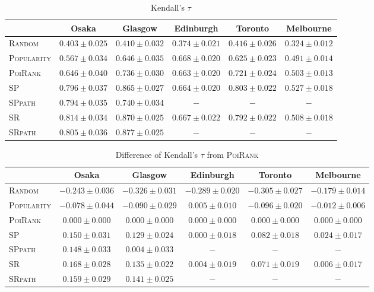 \begin{table*}[t]
\caption{Kendall's $\tau$}
\label{tab:tau}
\centering
\begin{tabular}{l|ccccc} \hline
 & Osaka & Glasgow & Edinburgh & Toronto & Melbourne \\ \hline
\textsc{Random} & $0.403\pm0.025$ & $0.410\pm0.032$ & $0.374\pm0.021$ & $0.416\pm0.026$ & $0.324\pm0.012$ \\
\textsc{Popularity} & $0.567\pm0.034$ & $0.646\pm0.035$ & $\mathbf{0.668\pm0.020}$ & $0.625\pm0.023$ & $0.491\pm0.014$ \\
\textsc{PoiRank} & $0.646\pm0.040$ & $0.736\pm0.030$ & $0.663\pm0.020$ & $0.721\pm0.024$ & $0.503\pm0.013$ \\
\textsc{SP} & $0.796\pm0.037$ & $0.865\pm0.027$ & $0.664\pm0.020$ & $\mathbf{0.803\pm0.022}$ & $\mathbf{0.527\pm0.018}$ \\
\textsc{SPpath} & $0.794\pm0.035$ & $0.740\pm0.034$ & $-$ & $-$ & $-$ \\
\textsc{SR} & $\mathbf{0.814\pm0.034}$ & $\mathit{0.870\pm0.025}$ & $\mathit{0.667\pm0.022}$ & $\mathit{0.792\pm0.022}$ & $\mathit{0.508\pm0.018}$ \\
\textsc{SRpath} & $\mathit{0.805\pm0.036}$ & $\mathbf{0.877\pm0.025}$ & $-$ & $-$ & $-$ \\
\hline
\end{tabular}
\end{table*}

\begin{table*}[t]
\caption{Difference of Kendall's $\tau$ from \textsc{PoiRank}}
\label{tab:dtau}
\centering
\begin{tabular}{l|ccccc} \hline
 & Osaka & Glasgow & Edinburgh & Toronto & Melbourne \\ \hline
\textsc{Random} & $-0.243\pm0.036$ & $-0.326\pm0.031$ & $-0.289\pm0.020$ & $-0.305\pm0.027$ & $-0.179\pm0.014$ \\
\textsc{Popularity} & $-0.078\pm0.044$ & $-0.090\pm0.029$ & $\mathbf{0.005\pm0.010}$ & $-0.096\pm0.020$ & $-0.012\pm0.006$ \\
\textsc{PoiRank} & $0.000\pm0.000$ & $0.000\pm0.000$ & $0.000\pm0.000$ & $0.000\pm0.000$ & $0.000\pm0.000$ \\
\textsc{SP} & $0.150\pm0.031$ & $0.129\pm0.024$ & $0.000\pm0.018$ & $\mathbf{0.082\pm0.018}$ & $\mathbf{0.024\pm0.017}$ \\
\textsc{SPpath} & $0.148\pm0.033$ & $0.004\pm0.033$ & $-$ & $-$ & $-$ \\
\textsc{SR} & $\mathbf{0.168\pm0.028}$ & $\mathit{0.135\pm0.022}$ & $\mathit{0.004\pm0.019}$ & $\mathit{0.071\pm0.019}$ & $\mathit{0.006\pm0.017}$ \\
\textsc{SRpath} & $\mathit{0.159\pm0.029}$ & $\mathbf{0.141\pm0.025}$ & $-$ & $-$ & $-$ \\
\hline
\end{tabular}
\end{table*}

